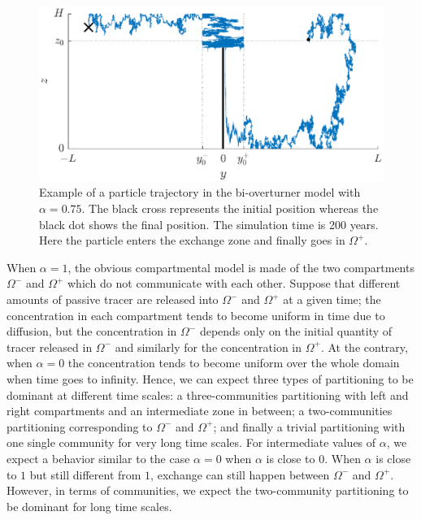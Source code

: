 \begin{figure}[!htp]
	\centering
	\includegraphics[width=\textwidth]{fig/problem2box/traj_with_transfer2.eps}
	\caption{Example of a particle trajectory in the bi-overturner model with $\alpha = 0.75$. The black cross represents the initial position whereas the black dot shows the final position. The simulation time is 200 years. Here the particle enters the exchange zone and finally goes in $\Omega^+$.}
	\label{fig:withtransfer}
\end{figure}
When $\alpha = 1$, the obvious compartmental model is made of the two compartments $\Omega^-$ and $\Omega^+$ which do not communicate with each other. Suppose that different amounts of passive tracer are released into $\Omega^-$ and $\Omega^+$ at a given time; the concentration in each compartment tends to become uniform in time due to diffusion, but the concentration in $\Omega^-$ depends only on the initial quantity of tracer released in $\Omega^-$ and similarly for the concentration in $\Omega^+$. At the contrary, when $\alpha = 0$ the concentration tends to become uniform over the whole domain when time goes to infinity. Hence, we can expect three types of partitioning to be dominant at different time scales: a three-communities partitioning with left and right compartments and an intermediate zone in between; a two-communities partitioning corresponding to $\Omega^-$ and $\Omega^+$; and finally a trivial partitioning with one single community for very long time scales. For intermediate values of $\alpha$, we expect a behavior similar to the case $\alpha = 0$ when $\alpha$ is close to $0$. When $\alpha$ is close to $1$ but still different from $1$, exchange can still happen between $\Omega^-$ and $\Omega^+$. However, in terms of communities, we expect the two-community partitioning to be dominant for long time scales.  

